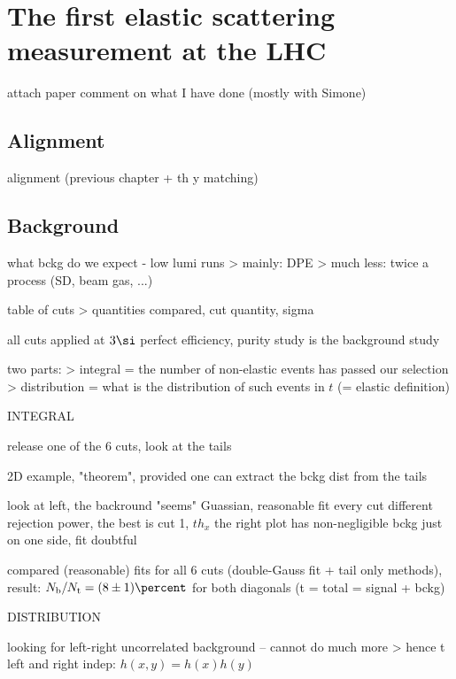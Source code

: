 \chapter[felm]{The first elastic scattering measurement at the LHC}

\> attach paper
\> comment on what I have done (mostly with Simone)

\section{Alignment}

\> alignment (previous chapter + th y matching)

\section{Background}

\> what bckg do we expect - low lumi runs
\>> mainly: DPE
\>> much less: twice a process (SD, beam gas, ...)

\> table of cuts
\>> quantities compared, cut quantity, sigma

\> all cuts applied at $3\si$ perfect efficiency, purity study is the background study

\> two parts:
\>> integral = the number of non-elastic events has passed our selection
\>> distribution = what is the distribution of such events in $t$ (= elastic definition)


INTEGRAL

\> release one of the 6 cuts, look at the tails

\> 2D example, "theorem", provided one can extract the bckg dist from the tails

\> look at  left, the backround "seems" Guassian, reasonable fit
\> every cut different rejection power, the best is cut 1, $th_x$
\> the right plot has non-negligible bckg just on one side, fit doubtful

\> compared (reasonable) fits for all 6 cuts (double-Gauss fit + tail only methods), result:
$N_{\rm b}/N_{\rm t} = (8\pm 1)\percent$ for both diagonals (t = total = signal + bckg)


DISTRIBUTION

\> looking for left-right uncorrelated background -- cannot do much more
\>> hence t left and right indep: $h(x, y) = h(x) h(y)$

